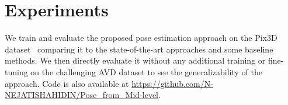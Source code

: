 \documentclass[letterpaper, 10 pt, conference]{ieeeconf}  \pdfoutput=1
\begin{document}
\begin{table*}
\centering
\vspace{6pt}
\caption{The azimuth classification accuracy for $9$ bins with $2.5^\circ$ overlap. Models are all trained category agnostic. }
\label{category_level}
\end{table*}
\section{Experiments}
We train and evaluate the proposed pose estimation approach on the Pix3D dataset~\cite{pix3d} comparing it to the state-of-the-art approaches \cite{pix3d,mousavian20173d} and some baseline methods. We then directly evaluate it without any additional training or fine-tuning on the challenging AVD dataset\cite{Ammirato2017ADF} to see the generalizability of the approach. Code is also available at \url{https://github.com/N-NEJATISHAHIDIN/Pose_from_Mid-level}.
\end{document}
